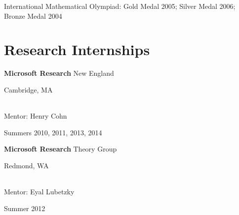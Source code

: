 \documentclass[11pt]{amsart}
\newcommand{\blankline}{\quad\vspace{-6pt}\pagebreak[2]}
\newcommand{\rightloc}[1]{\hfill {\raggedright #1}}
\newcommand{\rightdate}[1]{\hfill {\raggedright #1}}
\newcommand{\p}[1]{{\bfseries #1}}
\newcommand{\q}{\null\quad}
\begin{document}


International Mathematical Olympiad: Gold Medal 2005; Silver Medal
2006; Bronze Medal 2004


%
%
%

%
%


\section*{Research Internships}

\p{Microsoft Research} New England \rightloc{Cambridge, MA} \\
\q Mentor: Henry Cohn \rightdate{Summers 2010, 2011, 2013, 2014}

\blankline

\p{Microsoft Research} Theory Group
\rightloc{Redmond, WA} \\
\q Mentor: Eyal Lubetzky \rightdate{Summer 2012}




\end{document}

